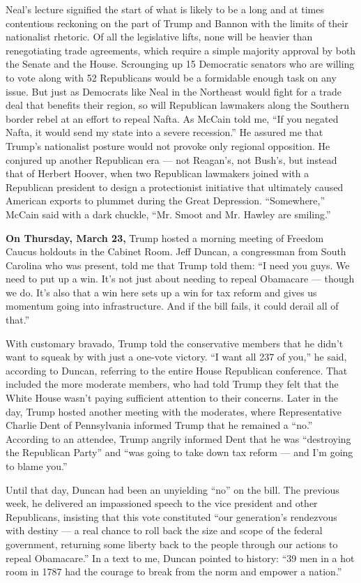 Neal's lecture signified the start of what is likely to be a long and at
times contentious reckoning on the part of Trump and Bannon with the
limits of their nationalist rhetoric. Of all the legislative lifts, none
will be heavier than renegotiating trade agreements, which require a
simple majority approval by both the Senate and the House. Scrounging up
15 Democratic senators who are willing to vote along with 52 Republicans
would be a formidable enough task on any issue. But just as Democrats
like Neal in the Northeast would fight for a trade deal that benefits
their region, so will Republican lawmakers along the Southern border
rebel at an effort to repeal Nafta. As McCain told me, ``If you negated
Nafta, it would send my state into a severe recession.'' He assured me
that Trump's nationalist posture would not provoke only regional
opposition. He conjured up another Republican era --- not Reagan's, not
Bush's, but instead that of Herbert Hoover, when two Republican
lawmakers joined with a Republican president to design a protectionist
initiative that ultimately caused American exports to plummet during the
Great Depression. ``Somewhere,'' McCain said with a dark chuckle, ``Mr.
Smoot and Mr. Hawley are smiling.''

\textbf{On Thursday, March 23,} Trump hosted a morning meeting of
Freedom Caucus holdouts in the Cabinet Room. Jeff Duncan, a congressman
from South Carolina who was present, told me that Trump told them: ``I
need you guys. We need to put up a win. It's not just about needing to
repeal Obamacare --- though we do. It's also that a win here sets up a
win for tax reform and gives us momentum going into infrastructure. And
if the bill fails, it could derail all of that.''

With customary bravado, Trump told the conservative members that he
didn't want to squeak by with just a one-vote victory. ``I want all 237
of you,'' he said, according to Duncan, referring to the entire House
Republican conference. That included the more moderate members, who had
told Trump they felt that the White House wasn't paying sufficient
attention to their concerns. Later in the day, Trump hosted another
meeting with the moderates, where Representative Charlie Dent of
Pennsylvania informed Trump that he remained a ``no.'' According to an
attendee, Trump angrily informed Dent that he was ``destroying the
Republican Party'' and ``was going to take down tax reform --- and I'm
going to blame you.''

Until that day, Duncan had been an unyielding ``no'' on the bill. The
previous week, he delivered an impassioned speech to the vice president
and other Republicans, insisting that this vote constituted ``our
generation's rendezvous with destiny --- a real chance to roll back the
size and scope of the federal government, returning some liberty back to
the people through our actions to repeal Obamacare.'' In a text to me,
Duncan pointed to history: ``39 men in a hot room in 1787 had the
courage to break from the norm and empower a nation.''

